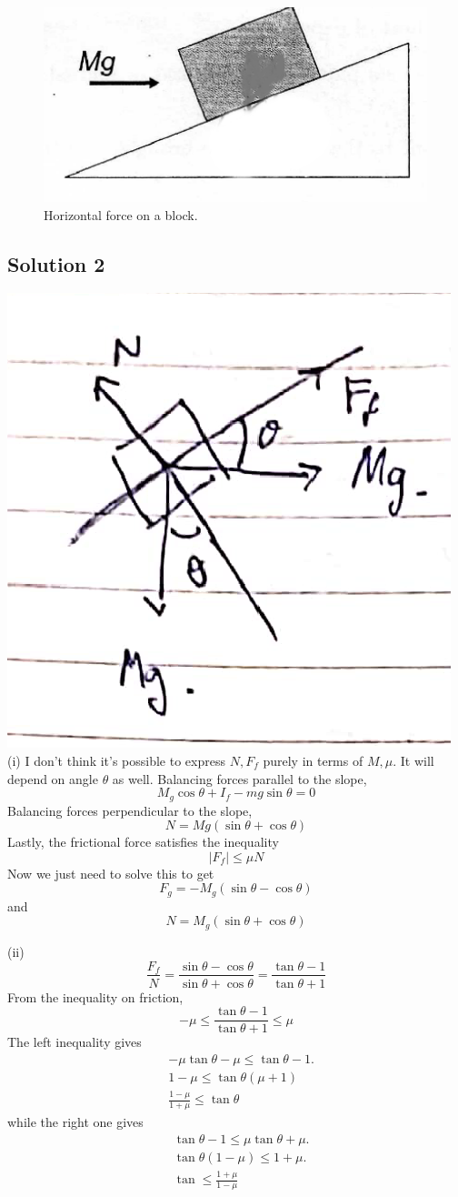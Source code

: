 \documentclass{article}
\begin{document}
\begin{figure}
\centering
\includegraphics[width=0.5 \linewidth]{spho_book_TYS_images/2010q2.png}
\caption{Horizontal force on a block.} \label{2010q2}
\end{figure}

\subsection{Solution 2}
\includegraphics[width=0.3\linewidth]{spho_book_TYS_images/2010q2_2.png} \\
(i) I don't think it's possible to express $N, F_f$ purely in terms of $M,\mu$. It will depend on angle $\theta$ as well.
Balancing forces parallel to the slope, \[M_{g} \cos \theta+{I}_{f}-m g \sin \theta=0\]
Balancing forces perpendicular to the slope, \[N=M g(\sin \theta+\cos \theta)\]
Lastly, the frictional force satisfies the inequality \[\left|F_{f}\right| \leq \mu N\]
Now we just need to solve this to get \[F_{g}=-M_{g}(\sin \theta-\cos \theta)\]
and \[N=M_{g}(\sin \theta+\cos \theta)\]

(ii)
\begin{equation}
	\frac{F_{f}}{N}=\frac{\sin \theta-\cos \theta}{\sin \theta + \cos\theta}=\frac{\tan \theta-1}{\tan \theta+1}
\end{equation}
From the inequality on friction, 
\[-\mu \leq \frac{\tan \theta-1}{\tan \theta+1} \leq \mu\]
The left inequality gives
\begin{equation}
	\begin{aligned}
		&-\mu \tan \theta-\mu \leq \tan \theta-1 . \\
		& 1-\mu \leq \tan \theta(\mu+1) \\
		& \frac{1-\mu}{1+\mu} \leq \operatorname{tan} \theta
	\end{aligned}
\end{equation}
while the right one gives
\begin{equation}
	\begin{aligned}
		&\tan \theta-1 \leq \mu \tan \theta+\mu . \\
		&\tan \theta(1-\mu) \leq 1+\mu . \\
		&\tan \leq \frac{1+\mu}{1-\mu}
	\end{aligned}
\end{equation}
\end{document}
